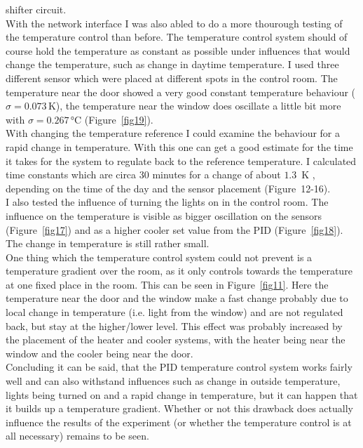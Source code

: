 \documentclass[12pt]{scrartcl}
\begin{document}
    shifter circuit.\\
    With the network interface I was also abled to do a more thourough testing
    of the temperature control than before. The temperature control system
    should of course hold the temperature as constant as possible under
    influences that would change the temperature, such as change in daytime
    temperature. I used three different sensor which were placed at different
    spots in the control room. The temperature near the door showed a very
    good constant temperature behaviour ($\sigma = 0.073\,\text{K}$), the
    temperature near the window does oscillate a little bit more with
    $\sigma = 0.267\,\text{°C}$ (Figure~\ref{fig19}). \\
    With changing the temperature reference I could examine the behaviour for a
    rapid change in temperature. With this one can get a good estimate for the
    time it takes for the system to regulate back to the reference temperature.
    I calculated time constants which are circa 30 minutes for a change of
    about $1.3$~K , depending on the time of the day and the sensor placement
    (Figure~12-16).\\
    I also tested the influence of turning the lights on in the control room.
    The influence on the temperature is visible as bigger oscillation on the
    sensors (Figure~\ref{fig17}) and as a higher cooler set value from the PID
    (Figure~\ref{fig18}). The change in temperature is still rather small.\\
    One thing which the temperature control system could not prevent is a temperature
    gradient over the room, as it only controls towards the temperature at one
    fixed place in the room. This can be seen in Figure~\ref{fig11}. Here the
    temperature near the door and the window make a fast change probably due to
    local change in temperature (i.e. light from the window) and are not regulated
    back, but stay at the higher/lower level. This effect was probably increased
    by the placement of the heater and cooler systems, with the heater being
    near the window and the cooler being near the door.\\
    Concluding it can be said, that the PID temperature control system works
    fairly well and can also withstand influences such as change in outside
    temperature, lights being turned on and a rapid change in temperature, but
    it can happen that it builds up a temperature gradient. Whether or not this
    drawback does actually influence the results of the experiment (or whether the temperature control is at all
    necessary) remains to be seen.
\end{document}
